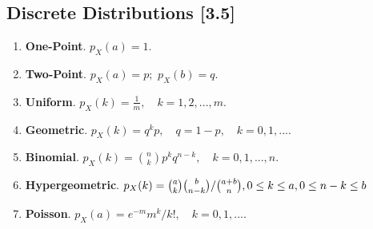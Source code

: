 \documentclass[a4paper,9pt]{extarticle}
\begin{document}
\begin{multicols*}{2}
\subsection{Discrete Distributions [3.5]}
\begin{enumerate}[label=\bfseries (\alph*)]
    \item \textbf{One-Point}. $p_X(a) = 1$.
    \item \textbf{Two-Point}. $p_X(a) = p;$ $p_X(b) = q$.
    \item \textbf{Uniform}. $p_X(k) = \frac{1}{m}, \quad k = 1,2, ..., m$.
    \item \textbf{Geometric}. $p_X(k) = q^k p, \quad q = 1-p, \quad k = 0,1, ...$.
    \item \textbf{Binomial}. $p_X(k) = \binom{n}{k} p^k q^{n-k}, \quad k = 0,1, ..., n$.
    \item \textbf{Hypergeometric}. $p_X(k) = \binom{a}{k} \binom{b}{n-k} / \binom{a + b}{n}, \\ 0 \leq k \leq a, 0 \leq n - k  \leq b$
    \item \textbf{Poisson}. $p_X(a) = e^{-m} m^k / k!, \quad k = 0, 1, ...$.
\end{enumerate}

\end{multicols*}
\end{document}
